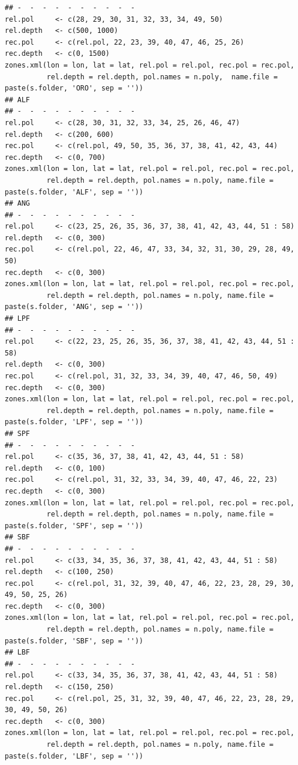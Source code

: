 \documentclass[11pt]{article}
\begin{document}
\begin{itemize}
\begin{itemize}
\begin{verbatim}
## -  -  -  -  -  -  -  -  -  -
rel.pol     <- c(28, 29, 30, 31, 32, 33, 34, 49, 50)
rel.depth   <- c(500, 1000)
rec.pol     <- c(rel.pol, 22, 23, 39, 40, 47, 46, 25, 26)
rec.depth   <- c(0, 1500)
zones.xml(lon = lon, lat = lat, rel.pol = rel.pol, rec.pol = rec.pol,
          rel.depth = rel.depth, pol.names = n.poly,  name.file = paste(s.folder, 'ORO', sep = ''))
## ALF
## -  -  -  -  -  -  -  -  -  -
rel.pol     <- c(28, 30, 31, 32, 33, 34, 25, 26, 46, 47)
rel.depth   <- c(200, 600)
rec.pol     <- c(rel.pol, 49, 50, 35, 36, 37, 38, 41, 42, 43, 44)
rec.depth   <- c(0, 700)
zones.xml(lon = lon, lat = lat, rel.pol = rel.pol, rec.pol = rec.pol,
          rel.depth = rel.depth, pol.names = n.poly, name.file = paste(s.folder, 'ALF', sep = ''))
## ANG
## -  -  -  -  -  -  -  -  -  -
rel.pol     <- c(23, 25, 26, 35, 36, 37, 38, 41, 42, 43, 44, 51 : 58)
rel.depth   <- c(0, 300)
rec.pol     <- c(rel.pol, 22, 46, 47, 33, 34, 32, 31, 30, 29, 28, 49, 50)
rec.depth   <- c(0, 300)
zones.xml(lon = lon, lat = lat, rel.pol = rel.pol, rec.pol = rec.pol,
          rel.depth = rel.depth, pol.names = n.poly, name.file = paste(s.folder, 'ANG', sep = ''))
## LPF
## -  -  -  -  -  -  -  -  -  -
rel.pol     <- c(22, 23, 25, 26, 35, 36, 37, 38, 41, 42, 43, 44, 51 : 58)
rel.depth   <- c(0, 300)
rec.pol     <- c(rel.pol, 31, 32, 33, 34, 39, 40, 47, 46, 50, 49)
rec.depth   <- c(0, 300)
zones.xml(lon = lon, lat = lat, rel.pol = rel.pol, rec.pol = rec.pol,
          rel.depth = rel.depth, pol.names = n.poly, name.file = paste(s.folder, 'LPF', sep = ''))
## SPF
## -  -  -  -  -  -  -  -  -  -
rel.pol     <- c(35, 36, 37, 38, 41, 42, 43, 44, 51 : 58)
rel.depth   <- c(0, 100)
rec.pol     <- c(rel.pol, 31, 32, 33, 34, 39, 40, 47, 46, 22, 23)
rec.depth   <- c(0, 300)
zones.xml(lon = lon, lat = lat, rel.pol = rel.pol, rec.pol = rec.pol,
          rel.depth = rel.depth, pol.names = n.poly, name.file = paste(s.folder, 'SPF', sep = ''))
## SBF
## -  -  -  -  -  -  -  -  -  -
rel.pol     <- c(33, 34, 35, 36, 37, 38, 41, 42, 43, 44, 51 : 58)
rel.depth   <- c(100, 250)
rec.pol     <- c(rel.pol, 31, 32, 39, 40, 47, 46, 22, 23, 28, 29, 30, 49, 50, 25, 26)
rec.depth   <- c(0, 300)
zones.xml(lon = lon, lat = lat, rel.pol = rel.pol, rec.pol = rec.pol,
          rel.depth = rel.depth, pol.names = n.poly, name.file = paste(s.folder, 'SBF', sep = ''))
## LBF
## -  -  -  -  -  -  -  -  -  -
rel.pol     <- c(33, 34, 35, 36, 37, 38, 41, 42, 43, 44, 51 : 58)
rel.depth   <- c(150, 250)
rec.pol     <- c(rel.pol, 25, 31, 32, 39, 40, 47, 46, 22, 23, 28, 29, 30, 49, 50, 26)
rec.depth   <- c(0, 300)
zones.xml(lon = lon, lat = lat, rel.pol = rel.pol, rec.pol = rec.pol,
          rel.depth = rel.depth, pol.names = n.poly, name.file = paste(s.folder, 'LBF', sep = ''))
\end{verbatim}


\end{itemize}
\end{itemize}
\end{document}
